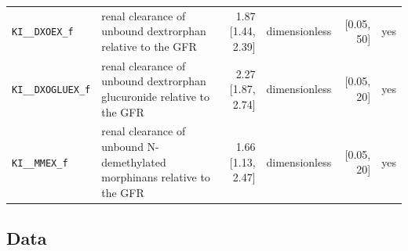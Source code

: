 \begin{longtable}{llrlrl}
\texttt{KI\_\_DXOEX\_f} & renal clearance of unbound dextrorphan relative to the GFR & 1.87 [1.44, 2.39] & dimensionless & [0.05, 50] & yes \\
\texttt{KI\_\_DXOGLUEX\_f} & renal clearance of unbound dextrorphan glucuronide relative to the GFR & 2.27 [1.87, 2.74] & dimensionless & [0.05, 20] & yes \\
\texttt{KI\_\_MMEX\_f} & renal clearance of unbound N-demethylated morphinans relative to the GFR & 1.66 [1.13, 2.47] & dimensionless & [0.05, 20] & yes \\
\end{longtable}

\subsection{Data}

